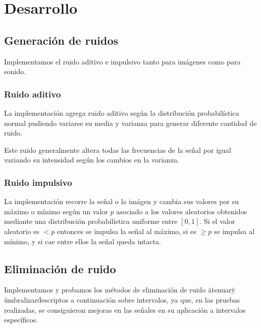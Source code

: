 \documentclass[a4paper,10pt,twoside]{article}
\begin{document}





\section{Desarrollo}
\subsection{Generación de ruidos}
Implementamos el ruido aditivo e impulsivo tanto para imágenes como para sonido.
\subsubsection{Ruido aditivo}
La implementación agrega ruido aditivo según la distribución probabilística normal pudiendo variarse su media y varianza para generar diferente cantidad de ruido.

Este ruido generalmente altera todas las frecuencias de la señal por igual variando su intensidad según los cambios en la varianza.

\subsubsection{Ruido impulsivo}
La implementación recorre la señal o la imágen y cambia sus valores por su máximo o mínimo según un valor $p$ asociado a los valores aleatorios obtenidos mediante una distribución probabilística uniforme entre $[0,1]$. Si el valor aleatorio es $< p$ entonces se impulsa la señal al máximo, si es $\geq p $ se impulsa al mínimo, y si cae entre ellos la señal queda intacta.

\subsection{Eliminación de ruido}
Implementamos y probamos los métodos de eliminación de ruido \"atenuar\" y \"umbralizar\" descriptos a continuación sobre intervalos, ya que, en las pruebas realizadas, se consiguieron mejoras en las señales en su aplicación a intervalos específicos.
\end{document}
